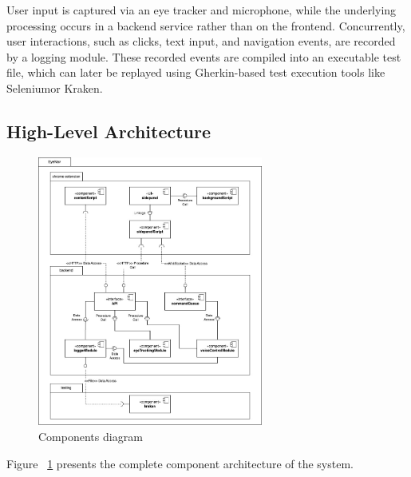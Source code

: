 User input is captured via an eye tracker and microphone, while the underlying processing occurs in a backend service rather than on the frontend. Concurrently, user interactions, such as clicks, text input, and navigation events, are recorded by a logging module. These recorded events are compiled into an executable test file, which can later be replayed using Gherkin-based test execution tools like Selenium\misref or Kraken\misref.





\subsection{High-Level Architecture}

\begin{figure}
    \centering
    \includegraphics[width=210pt]{imgs/components-diagram.jpg}
    \caption{Components diagram}
    \label{fig:components-diagram}
\end{figure}


Figure ~\ref{fig:components-diagram} presents the complete component architecture of the system.%

